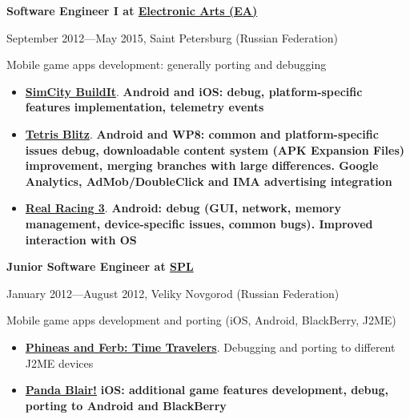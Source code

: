 {
\fontsize{12pt}{12pt}\selectfont
\bfseries Software Engineer I at
\href{http://www.ea.com}{Electronic Arts (EA)}
\mdseries
}

{
\fontsize{9pt}{8pt}\selectfont
September 2012---May 2015, Saint Petersburg (Russian Federation)
}

\subitem Mobile game apps development: generally porting and debugging
\begin{itemize}[rightmargin=\dimexpr\linewidth-18cm-\leftmargin\relax]
\setlength{\itemindent}{20pt}
\item
    \href{http://www.ea.com/simcity-buildit}
        {\bfseries SimCity BuildIt\mdseries}.
        \bfseries Android \mdseries and \bfseries iOS\mdseries:
        debug,
        platform-specific features implementation,
        telemetry events
\item
    \href{http://www.tetrisblitz.com}
        {\bfseries Tetris Blitz\mdseries}.
        \bfseries Android \mdseries and \bfseries WP8\mdseries:
        common and platform-specific issues debug,
        downloadable content system (APK Expansion Files) improvement,
        merging branches with large differences.
        Google Analytics, AdMob/DoubleClick and IMA advertising integration
\item
    \href{http://www.ea.com/real-racing-3}
    {\bfseries Real Racing 3\mdseries}.
        \bfseries Android\mdseries:
        debug (GUI, network, memory management, device-specific issues, common bugs).
        Improved interaction with OS
\end{itemize}

\vspace{0.5cm}

{
\fontsize{12pt}{12pt}\selectfont
\bfseries Junior Software Engineer at
\href{http://spl.co}{\bfseries SPL\mdseries}
\mdseries
}

{
\fontsize{9pt}{8pt}\selectfont
January 2012---August 2012, Veliky Novgorod (Russian Federation)
}

Mobile game apps development and porting
(iOS, Android, BlackBerry, J2ME)

\begin{itemize}[rightmargin=\dimexpr\linewidth-18cm-\leftmargin\relax]
\setlength{\itemindent}{20pt}
\item
    \href{http://java.mob.org/game/phineas\_and\_ferb\_time\_travelers.html}
        {\bfseries Phineas and Ferb: Time Travelers\mdseries}.
        Debugging and porting to different J2ME devices
\item
    \href{https://itunes.apple.com/us/app/panda-blair!/id500995558?mt=8}
        {\bfseries Panda Blair!\mdseries}
        \bfseries iOS\mdseries: additional game features development,
        debug,
        porting to \bfseries Android \mdseries and \bfseries BlackBerry\mdseries
\end{itemize}

